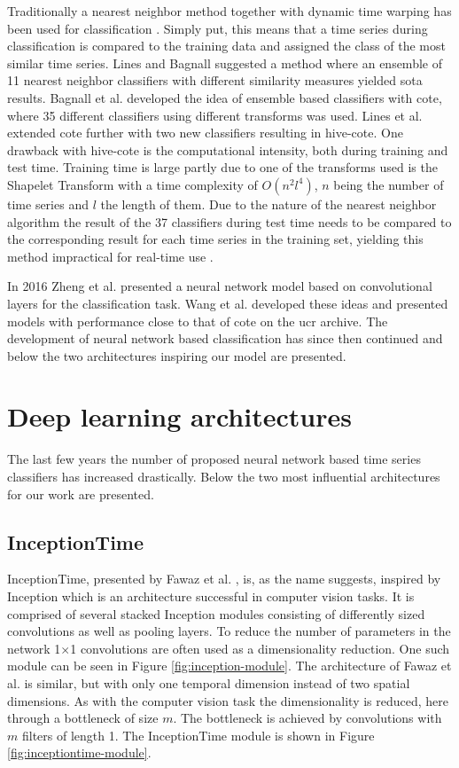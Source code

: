 Traditionally a nearest neighbor method together with dynamic time warping has been used for classification \cite{Bagnall2017}. Simply put, this means that a time series during classification is compared to the training data and assigned the class of the most similar time series. Lines and Bagnall suggested a method where an ensemble of 11 nearest neighbor classifiers with different similarity measures \cite{Lines2015} yielded \gls{sota} results. Bagnall et al. \cite{Bagnall2015} developed the idea of ensemble based classifiers with \gls{cote}, where 35 different classifiers using different transforms was used. Lines et al. \cite{Lines2016} extended \gls{cote} further with two new classifiers resulting in \gls{hive-cote}. One drawback with \gls{hive-cote} is the computational intensity, both during training and test time. Training time is large partly due to one of the transforms used is the Shapelet Transform with a time complexity of $O(n^2l^4)$, $n$ being the number of time series and $l$ the length of them. Due to the nature of the nearest neighbor algorithm the result of the 37 classifiers during test time needs to be compared to the corresponding result for each time series in the training set, yielding this method impractical for real-time use \cite{IsmailFawaz2019}.

In 2016 Zheng et al. \cite{Zheng2016} presented a neural network model based on convolutional layers for the classification task. Wang et al. \cite{Wang2017} developed these ideas and presented models with performance close to that of \gls{cote} on the \gls{ucr} archive. The development of neural network based classification has since then continued and below the two architectures inspiring our model are presented.

\section{Deep learning architectures}
The last few years the number of proposed neural network based time series classifiers has increased drastically. Below the two most influential architectures for our work are presented.

\subsection{InceptionTime} \label{sec:inception-time}
InceptionTime, presented by Fawaz et al. \cite{IsmailFawaz2020}, is, as the name suggests, inspired by Inception \cite{Szegedy2015} which is an architecture successful in computer vision tasks. It is comprised of several stacked Inception modules consisting of differently sized convolutions as well as pooling layers. To reduce the number of parameters in the network 1$\times$1 convolutions are often used as a dimensionality reduction. One such module can be seen in Figure \ref{fig:inception-module}. The architecture of Fawaz et al. is similar, but with only one temporal dimension instead of two spatial dimensions. As with the computer vision task the dimensionality is reduced, here through a bottleneck of size $m$. The bottleneck is achieved by convolutions with $m$ filters of length 1. The InceptionTime module is shown in Figure \ref{fig:inceptiontime-module}.

